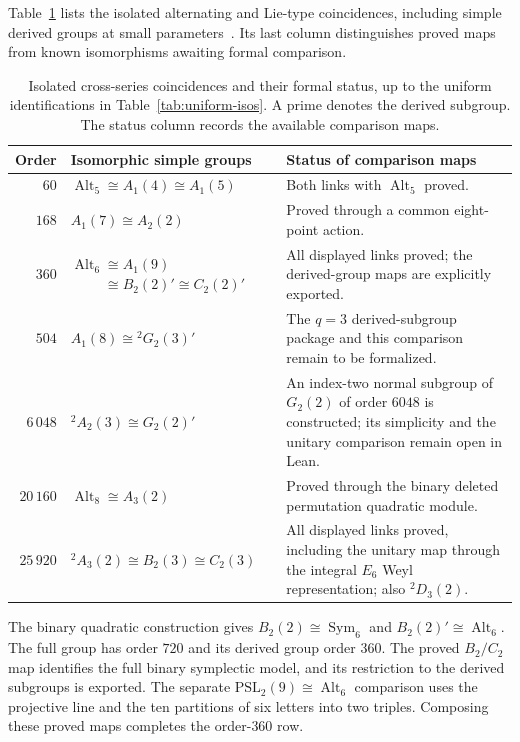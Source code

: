 \documentclass[11pt]{article}
\numberwithin{equation}{section}
\theoremstyle{definition}
\newcommand{\PSL}{\mathrm{PSL}}
\newcommand{\Alt}{\operatorname{Alt}}
\newcommand{\Sym}{\operatorname{Sym}}
\begin{document}
Table~\ref{tab:exceptional-isos} lists the isolated alternating and
Lie-type coincidences, including simple derived groups at small
parameters~\cite{ATLAS85,Wilson,ATLASOnline}. Its last column distinguishes
proved maps from known isomorphisms awaiting formal comparison.

\begin{table}[!htbp]
\centering\small
\setlength{\tabcolsep}{4pt}
\begin{tabularx}{\textwidth}{@{}r >{\raggedright\arraybackslash}p{} >{\raggedright\arraybackslash}X@{}}
\toprule
Order & Isomorphic simple groups & Status of comparison maps\\
\midrule
$60$ & $\Alt_5\cong A_1(4)\cong A_1(5)$ &
Both links with $\Alt_5$ proved.\\
\addlinespace
$168$ & $A_1(7)\cong A_2(2)$ & Proved through a common eight-point action.\\
\addlinespace
$360$ & $\Alt_6\cong A_1(9)$\newline
$\phantom{\Alt_6}\cong B_2(2)'\cong C_2(2)'$ &
All displayed links proved; the derived-group maps are explicitly exported.\\
\addlinespace
$504$ & $A_1(8)\cong{}^2G_2(3)'$ &
The $q=3$ derived-subgroup package and this comparison remain to be formalized.\\
\addlinespace
$6\,048$ & $ {}^2A_2(3)\cong G_2(2)'$ &
An index-two normal subgroup of $G_2(2)$ of order $6048$ is constructed;
its simplicity and the unitary comparison remain open in Lean.\\
\addlinespace
$20\,160$ & $\Alt_8\cong A_3(2)$ & Proved through the binary deleted permutation quadratic module.\\
\addlinespace
$25\,920$ & $ {}^2A_3(2)\cong B_2(3)\cong C_2(3)$ &
All displayed links proved, including the unitary map through the integral $E_6$ Weyl representation; also ${}^2D_3(2)$.\\
\bottomrule
\end{tabularx}
\caption{Isolated cross-series coincidences and their formal status,
up to the uniform identifications in Table~\ref{tab:uniform-isos}.
A prime denotes the derived subgroup. The status column records the
available comparison maps.}
\label{tab:exceptional-isos}
\end{table}

The binary quadratic construction gives $B_2(2)\cong\Sym_6$ and
$B_2(2)'\cong\Alt_6$.
The full group has order $720$ and its derived group order $360$.
The proved $B_2/C_2$ map identifies the full binary
symplectic model, and its restriction to the derived subgroups
is exported. The separate $\PSL_2(9)\cong\Alt_6$ comparison uses
the projective line and the ten partitions of six letters into two
triples. Composing these proved maps completes the order-$360$
row.
\end{document}
